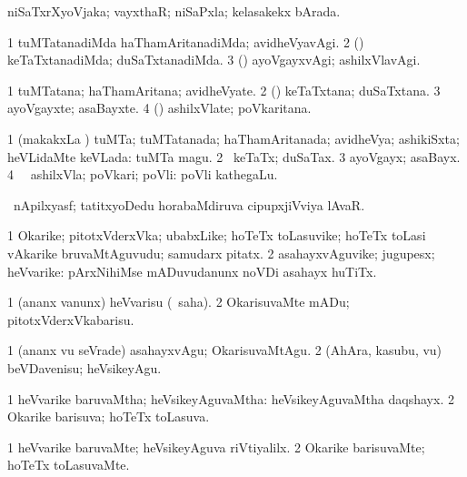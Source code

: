 \bentry
{}
\gl{\gu}
\bmng
niSaTxrXyoVjaka; vayxthaR; niSaPxla; kelasakekx bArada. 
\emng
\eentry

\bentry
{}
\gl{\kirxvi}
\bmng
\bnum
\num{1} tuMTatanadiMda haThamAritanadiMda; avidheVyavAgi. 
\num{2} (\pArxparx) keTaTxtanadiMda; duSaTxtanadiMda. 
\num{3} (\AmA) ayoVgayxvAgi; ashilxVlavAgi. 
\enum
\emng
\eentry

\bentry
{}
\gl{\nA}
\bmng
\bnum
\num{1} tuMTatana; haThamAritana; avidheVyate. 
\num{2} (\pArxparx) keTaTxtana; duSaTxtana. 
\num{3} ayoVgayxte; asaBayxte. 
\num{4} (\AmA) ashilxVlate; poVkaritana. 
\enum
\emng
\eentry

\bentry
{}
\gl{\gu}
\bmng
\bnum
\num{1} (makakxLa \vi) tuMTa; tuMTatanada; haThamAritanada; avidheVya; ashikiSxta; heVLidaMte keVLada:  tuMTa magu. 
\num{2} \pArxparx\ keTaTx; duSaTax. 
\num{3} ayoVgayx; asaBayx. 
\num{4} \AmA\ \hA\ ashilxVla; poVkari; poVli:  poVli kathegaLu. 
\enum
\emng
\eentry

\bentry
{}
\gl{\nA}
\bmng
\pArxvi\ nApilxyasf; tatitxyoDedu horabaMdiruva cipupxjiVviya lAvaR. 
\emng
\eentry

\bentry
{}
\gl{\nA}
\bmng
\bnum
\num{1} Okarike; pitotxVderxVka; ubabxLike; hoTeTx toLasuvike; hoTeTx toLasi vAkarike bruvaMtAguvudu; samudarx pitatx. 
\num{2} asahayxvAguvike; jugupesx; heVvarike:  pArxNihiMse mADuvudanunx noVDi asahayx huTiTx. 
\enum
\emng
\eentry

\bentry
{}
\gl{\sakirx}
\bmng
\bnum
\num{1} (ananx \mo vanunx) heVvarisu (\rUpa\ saha). 
\num{2} OkarisuvaMte mADu; pitotxVderxVkabarisu. 
\enum
\emng

\noindent
\gl{\akirx}
\bmng
\bnum
\num{1} (ananx \mo vu seVrade) asahayxvAgu; OkarisuvaMtAgu. 
\num{2} (AhAra, kasubu, \mo vu) beVDavenisu; heVsikeyAgu. 
\enum
\emng
\eentry

\bentry
{}
\gl{\gu}
\bmng
\bnum
\num{1} heVvarike baruvaMtha; heVsikeyAguvaMtha:  heVsikeyAguvaMtha daqshayx. 
\num{2} Okarike barisuva; hoTeTx toLasuva. 
\enum
\emng
\eentry

\bentry
{}
\gl{\kirxvi}
\bmng
\bnum
\num{1} heVvarike baruvaMte; heVsikeyAguva riVtiyalilx. 
\num{2} Okarike barisuvaMte; hoTeTx toLasuvaMte. 
\enum
\emng
\eentry

